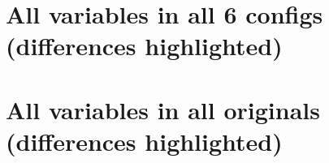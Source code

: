 \documentclass[10pt]{article}
\newcommand{\nmldiffer}[1]{#1} %
\newcommand{\doscript}[1]{{\footnotesize\textsf{}}}
\begin{document}
\newpage
\section{All variables in all 6 configs (differences highlighted)}
\renewcommand{\nmldiffer}[1]{\colorbox{hilite}{#1}}\setlength{\fboxsep}{0pt} %
\doscript{/Users/andy/anaconda/bin/python3 /Users/andy/bin/nmltab.py --format latex original/fabio_momsis1_input.nml original/paul_momsis025_input.nml original/fanghua_momsis01v5KDS75_WOA13_input.nml new_accessom2_1deg_jra55_ryf_input.nml new_accessom2_025deg_jra55_ryf_input.nml new_accessom2_01deg_jra55_ryf_input.nml}

\newpage
\section{All variables in all originals (differences highlighted)}
\renewcommand{\nmldiffer}[1]{\colorbox{hilite}{#1}}\setlength{\fboxsep}{0pt} %
\doscript{/Users/andy/anaconda/bin/python3 /Users/andy/bin/nmltab.py --format latex original/GFDL_ESM2M_input.nml original/MOM_SIS_TOPAZ_input.nml original/fabio_momsis1_input.nml original/paul_momsis025_input.nml original/fanghua_momsis01v5KDS75_WOA13_input.nml original/hogg_accessom2_1deg_jra55_ryf_input.nml original/kiss_accessom2_025deg_jra55_ryf_input.nml original/hogg_accessom2_01deg_jra55_ryf_input.nml}
\end{document}
